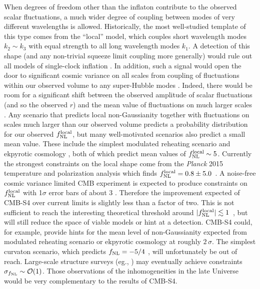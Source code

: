 When degrees of freedom other than the inflaton contribute to the observed scalar fluctuations, a much wider degree of coupling between modes of very different wavelengths is allowed. Historically, the most well-studied template of this type comes from the ``local'' model, which couples short wavelength modes $k_2\sim k_3$ with equal strength to all long wavelength modes $k_1$. A detection of this shape (and any non-trivial squeeze limit coupling more generally) would rule out all models of single-clock inflation \cite{Creminelli:2004yq}. In addition, such a signal would open the door to significant cosmic variance on all scales from coupling of fluctuations within our observed volume to any super-Hubble modes \cite{Nelson:2012sb,LoVerde:2013xka,Nurmi:2013xv}. Indeed, there would be room for a significant shift between the observed amplitude of scalar fluctuations (and so the observed $r$) and the mean value of fluctuations on much larger scales \cite{Bonga:2015urq}. Any scenario that predicts local non-Gaussianity together with fluctuations on scales much larger than our observed volume predicts a probability distribution for our observed $f_{\rm NL}^{\rm local}$, but many well-motivated scenarios also predict a small mean value. These include the simplest modulated reheating scenario \cite{Zaldarriaga:2003my} and ekpyrotic cosmology \cite{Lehners:2009ja}, both of which predict mean values of $f_{\rm NL}^{\rm local}\sim5$. 
Currently the strongest constraints on the local shape come from the {\it Planck\/} 2015 temperature and polarization analysis which finds $f_{\rm NL}^{\rm local} = 0.8 \pm 5.0$~\cite{Ade:2015ava}. A noise-free cosmic variance limited CMB experiment is expected to produce constraints on $f_{\rm NL}^{\rm local}$ with 1$\sigma$ error bars of about 3 \cite{Komatsu:2001rj}. Therefore the improvement expected of CMB-S4 over current limits is slightly less than a factor of two. This is not sufficient to reach the interesting theoretical threshold around $|f_{\rm NL}^{\rm local}|\lesssim 1$~\cite{Alvarez:2014vva}, but will still reduce the space of viable models or hint at a detection. CMB-S4 could, for example, provide hints for the mean level of non-Gaussianity expected from modulated reheating scenario or ekpyrotic cosmology at roughly $2\,\sigma$. The simplest curvaton scenario, which predicts $f_{\rm NL} = -5/4$ \cite{Lyth:2001nq}, will unfortunately be out of reach. Large-scale structure surveys (eg., \cite{Dore:2014cca}) may eventually achieve constraints $\sigma_{f_{\rm NL}}\sim\mathcal{O}(1)$. Those observations of the inhomogeneities in the late Universe would be very complementary to the results of CMB-S4.


